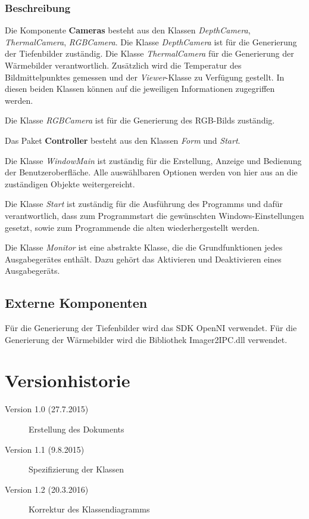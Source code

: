 \subsubsection{Beschreibung}
Die Komponente \textbf{Cameras} besteht aus den Klassen \textit{DepthCamera}, \textit{ThermalCamera}, \textit{RGBCamera}.
Die Klasse \textit{DepthCamera} ist für die Generierung der Tiefenbilder zuständig.
Die Klasse \textit{ThermalCamera} für die Generierung der Wärmebilder verantwortlich.
Zusätzlich wird die Temperatur des Bildmittelpunktes gemessen und der \textit{Viewer}-Klasse zu Verfügung gestellt.
In diesen beiden Klassen können auf die jeweiligen Informationen zugegriffen werden.

Die Klasse \textit{RGBCamera} ist für die Generierung des RGB-Bilds zuständig.

Das Paket \textbf{Controller} besteht aus den Klassen \textit{Form} und \textit{Start}.

Die Klasse \textit{WindowMain} ist zuständig für die Erstellung, Anzeige und Bedienung der Benutzeroberfläche.
Alle auswählbaren Optionen werden von hier aus an die zuständigen Objekte weitergereicht.

Die Klasse \textit{Start} ist zuständig für die Ausführung des Programms und dafür verantwortlich, dass zum Programmstart die gewünschten Windows-Einstellungen gesetzt, sowie zum Programmende die alten wiederhergestellt werden.

Die Klasse \textit{Monitor} ist eine abstrakte Klasse, die die Grundfunktionen jedes Ausgabegerätes enthält.
Dazu gehört das Aktivieren und Deaktivieren eines Ausgabegeräts.

\subsection{Externe Komponenten}
Für die Generierung der Tiefenbilder wird das SDK OpenNI verwendet.
Für die Generierung der Wärmebilder wird die Bibliothek Imager2IPC.dll verwendet.

\section{Versionhistorie}
\begin{description}
	\item [Version 1.0 (27.7.2015)] Erstellung des Dokuments
	\item [Version 1.1 (9.8.2015)] Spezifizierung der Klassen
	\item [Version 1.2 (20.3.2016)] Korrektur des Klassendiagramms
\end{description}